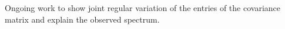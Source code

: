 \documentclass{beamer}
\begin{document}
\begin{frame}
  Ongoing work to show joint regular variation of the entries of
  the covariance matrix and explain the observed spectrum.
\end{frame}

\end{document}
